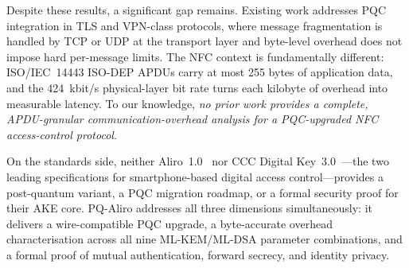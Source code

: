 Despite these results, a significant gap remains.
Existing work addresses PQC integration in TLS and VPN-class protocols, where
message fragmentation is handled by TCP or UDP at the transport layer and
byte-level overhead does not impose hard per-message limits.
The NFC context is fundamentally different: ISO/IEC~14443 ISO-DEP APDUs carry
at most 255 bytes of application data, and the 424~kbit/s physical-layer
bit rate turns each kilobyte of overhead into measurable latency.
To our knowledge, \emph{no prior work provides a complete, APDU-granular
communication-overhead analysis for a PQC-upgraded NFC access-control
protocol}.

On the standards side, neither Aliro~1.0~\cite{CSA:Aliro10} nor CCC Digital
Key~3.0~\cite{CCC:DigKey3}---the two leading specifications for smartphone-based
digital access control---provides a post-quantum variant, a PQC migration
roadmap, or a formal security proof for their AKE core.
PQ-Aliro addresses all three dimensions simultaneously: it delivers a
wire-compatible PQC upgrade, a byte-accurate overhead characterisation across
all nine ML-KEM/ML-DSA parameter combinations, and a formal proof of mutual
authentication, forward secrecy, and identity privacy.
